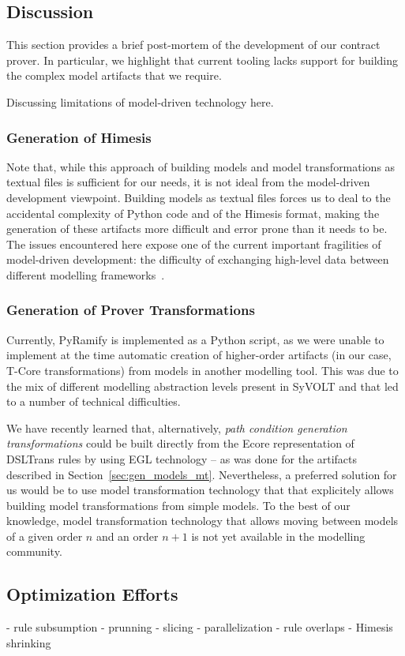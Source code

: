 \subsection{Discussion}
\label{subsec:tool_discussion}

This section provides a brief post-mortem of the development of our contract prover. In particular, we highlight that current tooling lacks support for building the complex model artifacts that we require.

Discussing limitations of model-driven technology here.


\subsubsection{Generation of Himesis}

Note that, while this approach of building models and model transformations as
textual files is sufficient for our needs, it is not ideal from the model-driven
development viewpoint. Building models as textual files forces us to deal to
the accidental complexity of Python code and of the Himesis format, making the
generation of these artifacts more difficult and error prone than it needs to
be. The issues encountered here expose one of the current important fragilities
of model-driven development: the difficulty of exchanging high-level data
between different modelling frameworks~.

\subsubsection{Generation of Prover Transformations}

Currently, PyRamify is implemented as a Python script, as we were unable to
implement at the time automatic creation of higher-order artifacts (in our
case, T-Core transformations) from models in another modelling tool.
This was due to the mix of different modelling abstraction levels present in
SyVOLT and that led to a number of technical difficulties.

We have recently learned that, alternatively, \emph{path condition generation
transformations} could be built directly from the Ecore representation of
DSLTrans rules by using EGL technology -- as was done for the artifacts
described in Section~\ref{sec:gen_models_mt}. Nevertheless, a preferred solution
for us would be to use model transformation technology that that explicitely
allows building model transformations from simple models. To the best of our
knowledge, model transformation technology that allows moving between models of
a given order $n$ and an order $n+1$ is not yet available in the modelling
community.

\subsection{Optimization Efforts}
- rule subsumption
- prunning
- slicing
- parallelization
- rule overlaps
- Himesis shrinking

